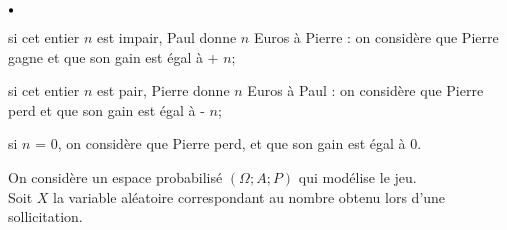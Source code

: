 \documentclass[11pt]{article}%
\begin{document}
\begin{noliste}{$\scriptstyle \bullet$}
\item si cet entier $n$ est impair, Paul donne $n$ Euros à Pierre : on
considère que Pierre gagne et que son gain est égal à + $n$;

\item si cet entier $n$ est pair, Pierre donne $n$ Euros à Paul : on
considère que Pierre perd et que son gain est égal à - $n$;

\item si $n$ = 0, on considère que Pierre perd, et que son gain est
égal à 0.
\end{noliste}

\noindent On considère un espace probabilisé $(\Omega ;A;P)$ qui
modélise le
jeu.\\
Soit $X$ la variable aléatoire correspondant au nombre obtenu lors
d'une
sollicitation.
\end{document}
